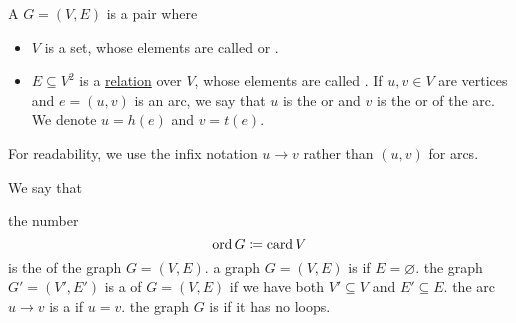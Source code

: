 \begin{definition}\label{def:directed_graph}
  A  \( G = (V, E) \) is a pair where
  \begin{itemize}
    \item \( V \) is a set, whose elements are called  or .
    \item \( E \subseteq V^2 \) is a \hyperref[def:relation]{relation} over \( V \), whose elements are called . If \( u, v \in V \) are vertices and \( e = (u, v) \) is an arc, we say that \( u \) is the  or  and \( v \) is the  or  of the arc. We denote $u = h(e)$ and $v = t(e)$.
  \end{itemize}

  For readability, we use the infix notation \( u \to v \) rather than \( (u, v) \) for arcs.

  We say that
  \begin{DefEnum}
     the number
    \begin{equation*}
      \operatorname{ord} G \coloneqq \operatorname{card} V
    \end{equation*}
    is the  of the graph \( G = (V, E) \).
     a graph \( G = (V, E) \) is  if \( E = \varnothing \).
     the graph \( G' = (V', E') \) is a  of \( G = (V, E) \) if we have both \( V' \subseteq V \) and \( E' \subseteq E \).
     the arc \( u \to v \) is a  if \( u = v \).
    the graph \( G \) is  if it has no loops.
  \end{DefEnum}
\end{definition}

\medskip

